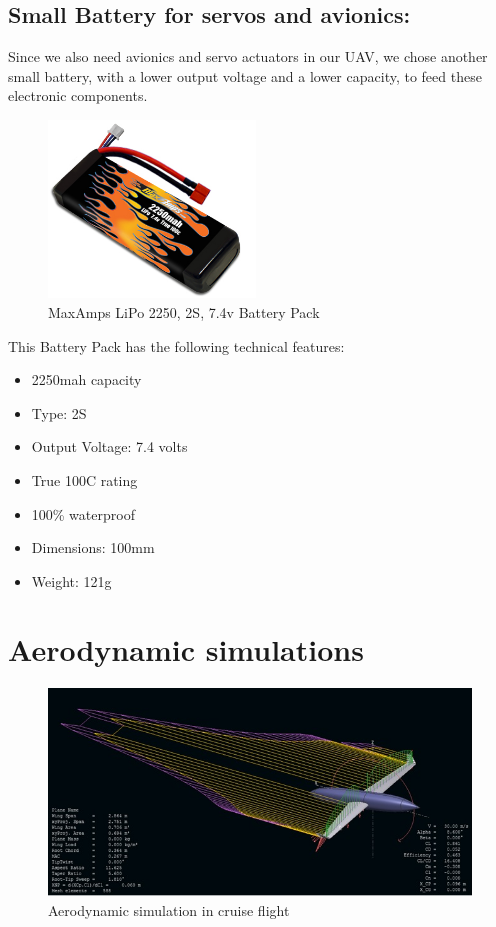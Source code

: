 \documentclass[english,fira]{ist-report}
\begin{document}
\section{Small Battery for servos and avionics:}
Since we also need avionics and servo actuators in our UAV, we chose another small battery, with a lower output voltage and a lower capacity, to feed these electronic components.\par

\begin{figure}[ht]
    \centering
    \includegraphics[width=0.49\textwidth]{graphics/AVIONICS/bat2.png}
    \caption{MaxAmps LiPo 2250, 2S, 7.4v Battery Pack}
    \label{fig:bat2}
\end{figure}
\newpage
This Battery Pack has the following technical features:
\begin{itemize}
    \item 2250mah capacity
    \item Type: 2S 
    \item Output Voltage: 7.4 volts
    \item True 100C rating
    \item 100\% waterproof
    \item Dimensions: 100mm \times 35mm \times 16mm
    \item Weight: 121g
\end{itemize}

\chapter{Aerodynamic simulations}\label{chap:Aerodynamic simulations}

\begin{figure}[!ht]
	\centering
	\includegraphics[width = 0.8\linewidth]{graphics/Aero_simulation_flight_cruise.png}
	\caption{Aerodynamic simulation in cruise flight}
	\label{fig:Aero_simulation_flight_cruise}
\end{figure}
\end{document}
